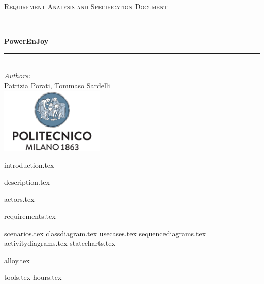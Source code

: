 \documentclass[a4paper,11pt]{article}
\begin{document}
\begin{titlepage}
\begin{center}
\textsc{\LARGE Requirement Analysis and Specification Document}\\[1.5cm] %

\rule{\linewidth}{0.5mm} \\[0.7cm]
{\huge \bfseries PowerEnJoy}\\[0.4cm] %
\rule{\linewidth}{0.5mm} \\[1.5cm]
 
\emph{Authors:}\\
Patrizia Porati, Tommaso Sardelli\\[2.0cm] 

\vfill
\vfill
\includegraphics[width=50mm]{polimi.png}\\
\end{center}
\end{titlepage}

\tableofcontents
\pagebreak

{introduction.tex}

{description.tex}

{actors.tex}

{requirements.tex}

{scenarios.tex}
{classdiagram.tex}
{usecases.tex}
{sequencediagrams.tex}
{activitydiagrams.tex}
{statecharts.tex}

{alloy.tex}

{tools.tex}
{hours.tex}
\end{document}
